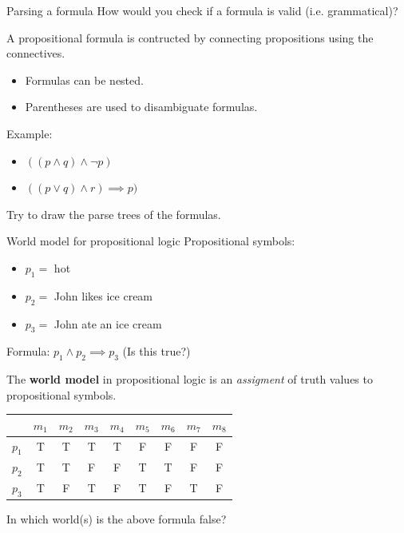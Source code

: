 \documentclass[usenames,dvipsnames,notes,11pt,aspectratio=169]{beamer}
\begin{document}
\begin{frame}
    {Parsing a formula}
    How would you check if a formula is valid (i.e. grammatical)?

    A propositional formula is contructed by connecting propositions using the connectives.
    \begin{itemize}
        \item Formulas can be nested.
        \item Parentheses are used to disambiguate formulas.
    \end{itemize}

    Example:
    \begin{itemize}
        \item[] $((p\land q) \land \neg p)$
        \item[] $((p\lor q) \land r) \implies p)$
    \end{itemize}
    Try to draw the parse trees of the formulas.

\end{frame}

\begin{frame}
    {World model for propositional logic}
    Propositional symbols:\\
    \begin{itemize}
        \item[] $p_1=$ hot
    \item[] $p_2=$ John likes ice cream
    \item[] $p_3=$ John ate an ice cream
    \end{itemize}

    Formula: $p_1 \land p_2 \implies p_3$ (Is this true?)
    \pause

    The \textbf{world model} in propositional logic is an \emph{assigment} of truth values to propositional symbols.
    \begin{table}
        \begin{tabular}{c|cccccccc}
            & $m_1$ & $m_2$ &$m_3$ &$m_4$ &$m_5$ &$m_6$ &$m_7$ &$m_8$ \\
            \midrule
            $p_1$ & T & T &T &T &F &F &F &F \\
            $p_2$ & T & T &F &F &T &T &F &F \\
            $p_3$ & T & F &T &F &T &F &T &F \\
        \end{tabular}
    \end{table}
    In which world(s) is the above formula false?
\end{frame}
\end{document}
